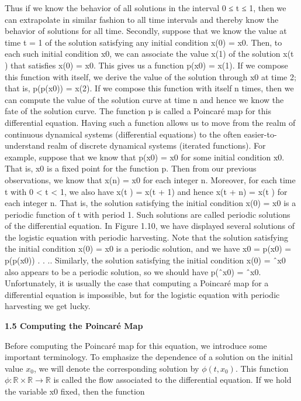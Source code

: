 \documentclass{article}
\begin{document}
Thus if we know the behavior of all solutions in the interval 0 ≤ t ≤ 1, then
we can extrapolate in similar fashion to all time intervals and thereby know
the behavior of solutions for all time.
Secondly, suppose that we know the value at time t = 1 of the solution
satisfying any initial condition x(0) = x0. Then, to each such initial condition
x0, we can associate the value x(1) of the solution x(t ) that satisfies x(0) = x0.
This gives us a function p(x0) = x(1). If we compose this function with itself,
we derive the value of the solution through x0 at time 2; that is, p(p(x0)) =
x(2). If we compose this function with itself n times, then we can compute
the value of the solution curve at time n and hence we know the fate of the
solution curve.
The function p is called a Poincaré map for this differential equation. Having
such a function allows us to move from the realm of continuous dynamical
systems (differential equations) to the often easier-to-understand realm of
discrete dynamical systems (iterated functions). For example, suppose that
we know that p(x0) = x0 for some initial condition x0. That is, x0 is a fixed
point for the function p. Then from our previous observations, we know that
x(n) = x0 for each integer n. Moreover, for each time t with 0 < t < 1, we
also have x(t ) = x(t + 1) and hence x(t + n) = x(t ) for each integer n.
That is, the solution satisfying the initial condition x(0) = x0 is a periodic
function of t with period 1. Such solutions are called periodic solutions of the
differential equation. In Figure 1.10, we have displayed several solutions of the
logistic equation with periodic harvesting. Note that the solution satisfying
the initial condition x(0) = x0 is a periodic solution, and we have x0 =
p(x0) = p(p(x0)) . . .. Similarly, the solution satisfying the initial condition
x(0) = ˆx0 also appears to be a periodic solution, so we should have p(ˆx0) = ˆx0.
Unfortunately, it is usually the case that computing a Poincaré map for a
differential equation is impossible, but for the logistic equation with periodic
harvesting we get lucky.

\hfill

\textbf{1.5 Computing the Poincaré Map}

\hfill

Before computing the Poincaré map for this equation, we introduce some
important terminology. To emphasize the dependence of a solution on the
initial value $x_0$, we will denote the corresponding solution by $\phi(t,x_0)$. This
function $\phi: \mathbb{R} \times \mathbb{R} \to  \mathbb{R}$ is called the flow associated to the differential
equation. If we hold the variable x0 fixed, then the function
\end{document}
